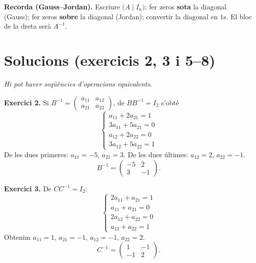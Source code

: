\documentclass[12pt,a4paper]{article}
\newcommand{\blocInici}{%
  \par\nobreak\vspace{0pt}%
  \begin{minipage}[t]{\linewidth}%
}
\newcommand{\blocFi}{%
  \end{minipage}%
  \par
}
\begin{document}
\vspace{0.35em}
\begin{tcolorbox}[
  colback=white,
  colframe=margueVerdClar,
  boxrule=0.7pt,
  arc=2pt,
  left=5pt, right=5pt, top=3pt, bottom=3pt,
  fontupper=\small
]
\textbf{Recorda (Gauss--Jordan).}
Escriure $\bigl(A \mid I_n\bigr)$; fer zeros \textbf{sota} la diagonal (Gauss);
fer zeros \textbf{sobre} la diagonal (Jordan); convertir la diagonal en $1$s.
El bloc de la dreta serà $A^{-1}$.
\end{tcolorbox}

\newpage
\section*{Solucions (exercicis 2, 3 i 5--8)}
{\small\textit{Hi pot haver seqüències d'operacions equivalents.}}

\vspace{0.35em}
\footnotesize

%
\blocInici
\noindent\textbf{Exercici 2.}
Si $B^{-1}=\begin{pmatrix} a_{11}&a_{12}\\ a_{21}&a_{22}\end{pmatrix}$, de $B B^{-1}=I_2$ s'obté
\[
  \begin{cases}
    a_{11}+2a_{21}=1 \\
    3a_{11}+5a_{21}=0 \\
    a_{12}+2a_{22}=0 \\
    3a_{12}+5a_{22}=1
  \end{cases}
\]
De les dues primeres: $a_{11}=-5$, $a_{21}=3$.
De les dues últimes: $a_{12}=2$, $a_{22}=-1$.
\[
  B^{-1} = \begin{pmatrix} -5 & 2 \\ 3 & -1 \end{pmatrix}.
\]
\blocFi

\vspace{0.5em}

%
\blocInici
\noindent\textbf{Exercici 3.}
De $C C^{-1}=I_2$:
\[
  \begin{cases}
    2a_{11}+a_{21}=1 \\
    a_{11}+a_{21}=0 \\
    2a_{12}+a_{22}=0 \\
    a_{12}+a_{22}=1
  \end{cases}
\]
Obtenim $a_{11}=1$, $a_{21}=-1$, $a_{12}=-1$, $a_{22}=2$.
\[
  C^{-1} = \begin{pmatrix} 1 & -1 \\ -1 & 2 \end{pmatrix}.
\]
\blocFi
\end{document}

